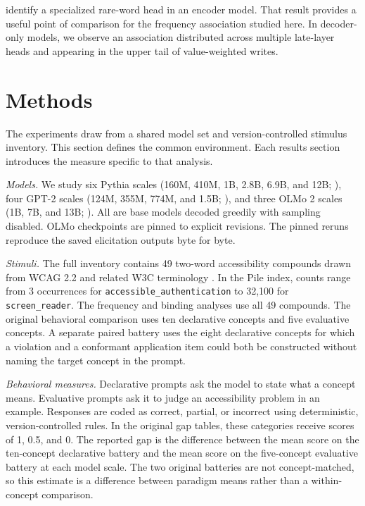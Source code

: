 \documentclass[
  english,
]{article}
\begin{document}
\citet{voita2019analyzing} identify a specialized rare-word head in an encoder model. That result provides a useful point of comparison for the frequency association studied here. In decoder-only models, we observe an association distributed across multiple late-layer heads and appearing in the upper tail of value-weighted writes.

\section{Methods}\label{methods}

The experiments draw from a shared model set and version-controlled stimulus inventory. This section defines the common environment. Each results section introduces the measure specific to that analysis.

\emph{Models.} We study six Pythia scales (160M, 410M, 1B, 2.8B, 6.9B, and 12B; \citealp{biderman2023pythia}), four GPT-2 scales (124M, 355M, 774M, and 1.5B; \citealp{radford2019language}), and three OLMo 2 scales (1B, 7B, and 13B; \citealp{olmo2025furious}). All are base models decoded greedily with sampling disabled. OLMo checkpoints are pinned to explicit revisions. The pinned reruns reproduce the saved elicitation outputs byte for byte.

\emph{Stimuli.} The full inventory contains 49 two-word accessibility compounds drawn from WCAG 2.2 and related W3C terminology \citep{w3c2024wcag}. In the Pile index, counts range from 3 occurrences for \texttt{accessible\_authentication} to 32,100 for \texttt{screen\_reader}. The frequency and binding analyses use all 49 compounds. The original behavioral comparison uses ten declarative concepts and five evaluative concepts. A separate paired battery uses the eight declarative concepts for which a violation and a conformant application item could both be constructed without naming the target concept in the prompt.

\emph{Behavioral measures.} Declarative prompts ask the model to state what a concept means. Evaluative prompts ask it to judge an accessibility problem in an example. Responses are coded as correct, partial, or incorrect using deterministic, version-controlled rules. In the original gap tables, these categories receive scores of 1, 0.5, and 0. The reported gap is the difference between the mean score on the ten-concept declarative battery and the mean score on the five-concept evaluative battery at each model scale. The two original batteries are not concept-matched, so this estimate is a difference between paradigm means rather than a within-concept comparison.
\end{document}
